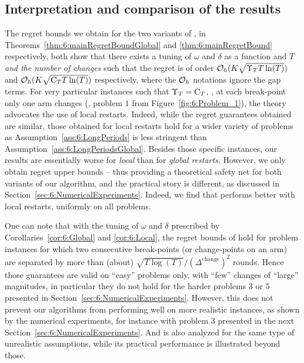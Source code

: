 \subsection{Interpretation and comparison of the results}
\label{sub:6:interpretationRegretBounds}

The regret bounds we obtain for the two variants of \GLRklUCB,
in Theorems~\ref{thm:6:mainRegretBoundGlobal} and \ref{thm:6:mainRegretBound} respectively,
both show that there exists a tuning of $\omega$ and $\delta$ as a function and $T$ \emph{and the number of changes} such that the regret is of order $\mathcal{O}_h(K\sqrt{\Upsilon_T T \ln(T)})$ and $\mathcal{O}_h(K\sqrt{\mathrm{C}_T T \ln(T)})$ respectively, where the $\mathcal{O}_h$ notations ignore the gap terms.
%
For very particular instances such that $\Upsilon_T = \mathrm{C}_T$, \ie, at each break-point only one arm changes (\eg, problem $1$ from Figure~\ref{fig:6:Problem_1}), the theory advocates the use of local restarts.
%
Indeed, while the regret guarantees obtained are similar, those obtained for local restarts hold for a wider variety of problems as Assumption~\ref{ass:6:LongPeriods} is less stringent than Assumption~\ref{ass:6:LongPeriodsGlobal}.
%
Besides those specific instances, our results are essentially worse for \emph{local} than for \emph{global restarts}. However, we only obtain regret upper bounds -- thus providing a theoretical safety net for both variants of our algorithm, and the practical story is different, as discussed in Section~\ref{sec:6:NumericalExperiments}.
Indeed, we find that \GLRklUCB{} performs better with local restarts, uniformly on all problems.

One can note that with the tuning of $\omega$ and $\delta$ prescribed by Corollaries~\ref{cor:6:Global} and \ref{cor:6:Local}, the regret bounds of \GLRklUCB{} hold for problem instances for which two consecutive break-points (or change-points on an arm) are separated by more than (about) $\sqrt{T\log(T)}/(\Delta^{\text{change}})^2$ rounds.
Hence those guarantees are valid on ``easy'' problems only, with ``few'' changes of ``large'' magnitudes, in particular they do not hold for the harder problems $3$ or $5$ presented in Section~\ref{sec:6:NumericalExperiments}.
%
However, this does not prevent our algorithms from performing well on more realistic instances, as shown by the numerical experiments,
for instance with problem $3$ presented in the next Section~\ref{sec:6:NumericalExperiments}.
%
And \MUCB{} \cite{CaoZhenKvetonXie18} is also analyzed for the same type of unrealistic assumptions, while its practical performance is illustrated beyond those.


